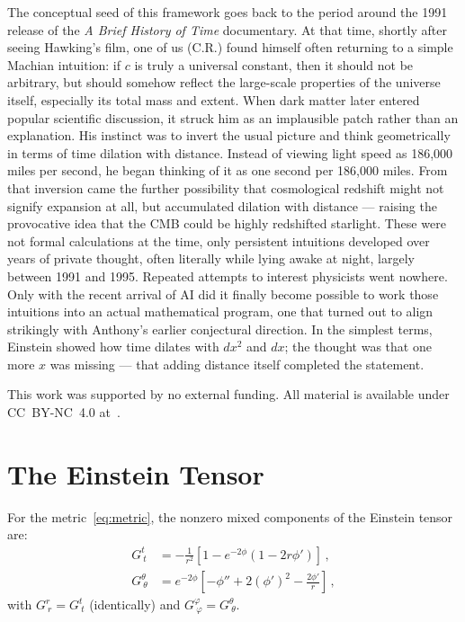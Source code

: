 \documentclass[aps,prd,twocolumn,superscriptaddress,nofootinbib,longbibliography]{revtex4-2}
\begin{document}
\begin{acknowledgments}
The conceptual seed of this framework goes back to the period around
the 1991 release of the \textit{A Brief History of Time} documentary.
At that time, shortly after seeing Hawking's film, one of us (C.R.) found himself
often returning to a simple Machian intuition: if $c$ is truly a
universal constant, then it should not be arbitrary, but should
somehow reflect the large-scale properties of the universe itself,
especially its total mass and extent.  When dark matter later entered
popular scientific discussion, it struck him as an implausible patch
rather than an explanation.  His instinct was to invert the usual
picture and think geometrically in terms of time dilation with
distance.  Instead of viewing light speed as 186,000 miles per second,
he began thinking of it as one second per 186,000 miles.  From that
inversion came the further possibility that cosmological redshift
might not signify expansion at all, but accumulated dilation with
distance --- raising the provocative idea that the CMB could be highly
redshifted starlight.  These were not formal calculations at the time,
only persistent intuitions developed over years of private thought,
often literally while lying awake at night, largely between 1991 and
1995.  Repeated attempts to interest physicists went nowhere.  Only
with the recent arrival of AI did it finally become possible to work
those intuitions into an actual mathematical program, one that turned
out to align strikingly with Anthony's earlier conjectural direction.
In the simplest terms, Einstein showed how time dilates with $dx^2$
and $dx$; the thought was that one more $x$ was missing --- that
adding distance itself completed the statement.

This work was supported by no external funding.  All material is available
under CC~BY-NC~4.0 at~\cite{zenodo2025}.
\end{acknowledgments}

\appendix

\section{The Einstein Tensor}\label{app:einstein}

For the metric~\eqref{eq:metric}, the nonzero mixed components
of the Einstein tensor are:
\begin{align}
  G^t_{\ t} &= -\frac{1}{r^2}\left[1 - e^{-2\phi}(1 - 2r\phi')
    \right]\,, \label{eq:Gtt}\\
  G^\theta_{\ \theta} &= e^{-2\phi}\left[-\phi'' + 2(\phi')^2
    - \frac{2\phi'}{r}\right]\,, \label{eq:Gthth}
\end{align}
with $G^r_{\ r} = G^t_{\ t}$ (identically) and
$G^\varphi_{\ \varphi} = G^\theta_{\ \theta}$.
\end{document}
